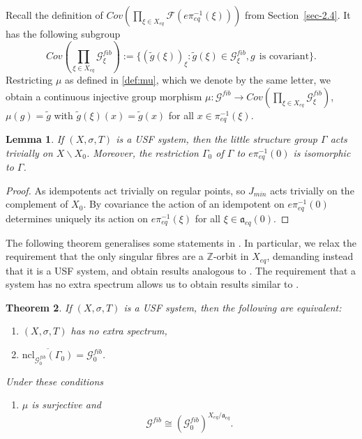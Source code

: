 \documentclass[10pt,a4paper]{amsart}
\newtheorem{theorem}{Theorem}[section]
\newtheorem{lemma}[theorem]{Lemma}
\numberwithin{equation}{section}
\newcommand{\Ff}{{\mathcal F}}
\newcommand{\Gg}{{\mathcal G}}
\newcommand{\Xe}{X_{eq}}
\newcommand{\aut}{{\mathfrak a}}
\newcommand{\aute}{\aut_{eq}}
\newcommand{\pe}{\pi_{eq}}
\begin{document}
Recall the definition of $Cov(\prod_{\xi\in \Xe} \Ff(e\pe^{-1}(\xi)))$ from Section~\ref{sec-2.4}. 
It has the following subgroup
$$Cov(\prod_{\xi\in \Xe} \Gg^{fib}_\xi):=\{(\tilde g(\xi))_\xi:\tilde g(\xi)\in \Gg^{fib}_\xi, g\:\:\mbox{is covariant}\}.$$
Restricting $\mu$ as defined in \eqref{def:mu}, which we denote by the same letter, we obtain a continuous injective group morphism
$\mu:\Gg^{fib} \to Cov(\prod_{\xi\in \Xe} \Gg^{fib}_\xi)$, 
$\mu(g) = \tilde g$ with $\tilde g(\xi)(x) = \tilde g(x)$ for all $x\in \pe^{-1}(\xi)$. 
\begin{lemma}\label{lem-little}
If $(X,\sigma,T)$ is a USF system, then the  little structure group $\Gamma$ acts trivially on $X\backslash X_0$. Moreover, the restriction $\Gamma_0$ of $\Gamma$ to $e\pe^{-1}(0)$ 
is isomorphic to $\Gamma$.
\end{lemma}
\begin{proof}
As idempotents act trivially on regular points, so  $J_{min}$ acts trivially on the complement of $X_0$. By covariance the action of an idempotent on $e\pe^{-1}(0)$ determines uniquely its action on $e\pe^{-1}(\xi)$ for all $\xi \in \aute(0)$.
\end{proof}
The following theorem generalises some statements in 
\cite[Section 3]{ESBS}. In particular, we relax the requirement that the only singular fibres are a  $\mathbb Z$-orbit in $\Xe$,  demanding instead that it is a USF system, and obtain results analogous to \cite[Corollary 3.7]{ESBS}. The requirement that a system has no extra spectrum allows us to obtain results similar to \cite[Thm 3.14]{ESBS}. 


\begin{theorem} \label{thm-prod}
If $(X,\sigma,T)$ is a USF system, then the following are equivalent:
\begin{enumerate}
\item $(X,\sigma,T)$ has no extra spectrum,
\item 
$  \overline{\text{ncl}_{\Gg^{fib}_0}(\Gamma_0)} =\Gg^{fib}_0$.
\end{enumerate}
Under these conditions
\begin{enumerate}
\item[(3)] $\mu$ is surjective and
$$\Gg^{fib} \cong    (\Gg^{fib}_0)^{\Xe/\aute} .  $$
\end{enumerate}
\end{theorem}
\end{document}
